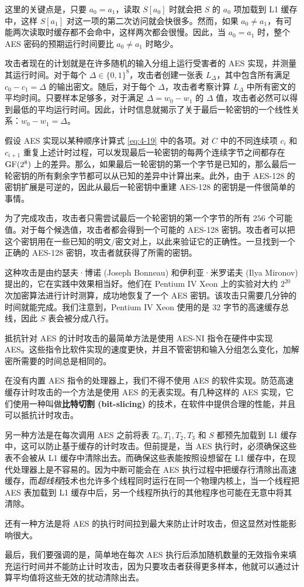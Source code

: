 这里的关键点是，只要 $a_0=a_1$，读取 $S[a_0]$ 时就会把 $S$ 的 $a_0$ 项加载到 L1 缓存中，这样 $S[a_1]$ 对这一项的第二次访问就会快很多。然而，如果 $a_0\neq a_1$，有可能两次读取时缓存都不会命中，这样两次都会很慢。因此，当 $a_0=a_1$ 时，整个 AES 密码的预期运行时间要比 $a_0\neq a_1$ 时略少。

攻击者现在的计划就是在许多随机的输入分组上运行受害者的 AES 实现，并测量其运行时间。对于每个 $\Delta\in\{0,1\}^8$，攻击者创建一张表 $L_\Delta$，其中包含所有满足 $c_0-c_1=\Delta$ 的输出密文。随后，对于每个 $\Delta$，攻击者考察计算 $L_\Delta$ 中所有密文的平均时间。只要样本足够多，对于满足 $\Delta=w_0-w_1$ 的 $\Delta$ 值，攻击者必然可以得到最低的平均运行时间。因此，计时信息就揭示了关于最后一轮密钥的一个线性关系：$w_0-w_1=\Delta$。

假设 AES 实现以某种顺序计算式 \ref{eq:4-19} 中的各项。对 $C$ 中的不同连续项 $c_i$ 和 $c_{i+1}$ 重复上述计时过程，可以发现最后一轮密钥的每两个连续字节之间都存在 ${\rm GF}(2^8)$ 上的差异。那么，如果最后一轮密钥的第一个字节是已知的，那么最后一轮密钥的所有剩余字节都可以从已知的差异中计算出来。此外，由于 AES-128 的密钥扩展是可逆的，因此从最后一轮密钥中重建 AES-128 的密钥是一件很简单的事情。

为了完成攻击，攻击者只需尝试最后一个轮密钥的第一个字节的所有 $256$ 个可能值。对于每个候选值，攻击者都会得到一个可能的 AES-128 密钥。攻击者可以把这个密钥用在一些已知的明文/密文对上，以此来验证它的正确性。一旦找到一个正确的 AES-128 密钥，攻击者就获得了所需的密钥。

这种攻击是由约瑟夫·博诺 (Joseph Bonneau) 和伊利亚·米罗诺夫 (Ilya Mironov) 提出的，它在实践中效果相当好。他们在 Pentium IV Xeon 上的实验对大约 $2^{20}$ 次加密算法进行计时测算，成功地恢复了一个 AES 密钥。该攻击只需要几分钟的时间就能完成。我们注意到，Pentium IV Xeon 使用的是 $32$ 字节的高速缓存总线，因此 $S$ 表会被分成八行。

\begin{snote}[缓和措施。]
抵抗针对 AES 的计时攻击的最简单方法是使用 AES-NI 指令在硬件中实现 AES。这些指令比软件实现的速度更快，并且不管密钥和输入分组怎么变化，加解密所需要的时间总是相同的。

在没有内置 AES 指令的处理器上，我们不得不使用 AES 的软件实现。防范高速缓存计时攻击的一个方法是使用 AES 的无表实现。有几种这样的 AES 实现，它们使用一种叫做\textbf{比特切割 (bit-slicing)} 的技术，在软件中提供合理的性能，并且可以抵抗计时攻击。

另一种方法是在每次调用 AES 之前将表 $T_0,T_1,T_2,T_3$ 和 $S$ 都预先加载到 L1 缓存中，这可以防止基于缓存的计时攻击。但前提是，当 AES 执行时，必须确保这些表不会被从 L1 缓存中清除出去。而确保这些表能按照设想留在 L1 缓存中，在现代处理器上是不容易的。因为中断可能会在 AES 执行过程中把缓存行清除出高速缓存，而\emph{超线程}技术也允许多个线程同时运行在同一个物理内核上，当一个线程把 AES 表加载到 L1 缓存中后，另一个线程所执行的其他程序也可能在无意中将其清除。

还有一种方法是将 AES 的执行时间拉到最大来防止计时攻击，但这显然对性能影响很大。

最后，我们要强调的是，简单地在每次 AES 执行后添加随机数量的无效指令来填充运行时间并不能防止计时攻击，因为只要攻击者获得更多样本，他就可以通过计算平均值将这些无效的扰动清除出去。
\end{snote}

